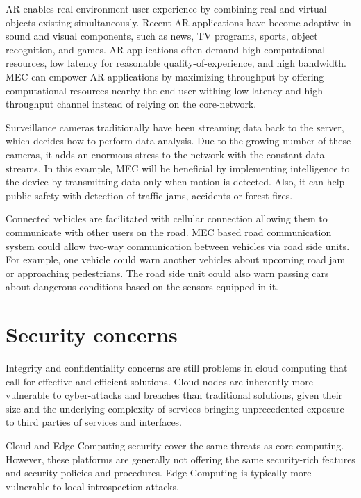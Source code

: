 AR enables real environment user experience by combining real and virtual objects existing simultaneously. Recent AR applications have become adaptive in sound and visual components, such as news, TV programs, sports, object recognition, and games. AR applications often demand high computational resources, low latency for reasonable quality-of-experience, and high bandwidth. MEC can empower AR applications by maximizing throughput by offering computational resources nearby the end-user withing low-latency and high throughput channel instead of relying on the core-network. \cite{Abbas2018}

Surveillance cameras traditionally have been streaming data back to the server, which decides how to perform data analysis. Due to the growing number of these cameras, it adds an enormous stress to the network with the constant data streams. In this example, MEC will be beneficial by implementing intelligence to the device by transmitting data only when motion is detected. Also, it can help public safety with detection of traffic jams, accidents or forest fires.

Connected vehicles are facilitated with cellular connection allowing them to communicate with other users on the road. MEC based road communication system could allow two-way communication between vehicles via road side units. For example, one vehicle could warn another vehicles about upcoming road jam or approaching pedestrians. The road side unit could also warn passing cars about dangerous conditions based on the sensors equipped in it. \cite{Abbas2018}

\section{Security concerns}

Integrity and confidentiality concerns are still problems in cloud computing that call for effective and efficient solutions. Cloud nodes are inherently more vulnerable to cyber-attacks and breaches than traditional solutions, given their size and the underlying complexity of services bringing unprecedented exposure to third parties of services and interfaces. \cite{Lombardi2011}

Cloud and Edge Computing security cover the same threats as core computing. However, these platforms are generally not offering the same security-rich features and security policies and procedures. Edge Computing is typically more vulnerable to local introspection attacks. \cite{EdgeComputing5G} 

